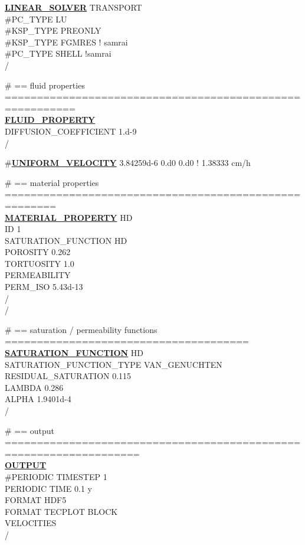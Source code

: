 \noindent
\hyperlink{target_linsolv}{\bf LINEAR\_SOLVER} TRANSPORT\\
\#PC\_TYPE LU\\
\#KSP\_TYPE PREONLY\\
\#KSP\_TYPE FGMRES ! samrai\\
\#PC\_TYPE SHELL !samrai\\
/

\noindent
\# == fluid properties =========================================================\\
\hyperlink{target_fluid_property}{\bf FLUID\_PROPERTY}\\
DIFFUSION\_COEFFICIENT 1.d-9\\
/

\noindent
\#\hyperlink{target_unifvel}{\bf UNIFORM\_VELOCITY} 3.84259d-6 0.d0 0.d0  ! 1.38333 cm/h

\noindent
\# == material properties ======================================================\\
\hyperlink{target_mat}{\bf MATERIAL\_PROPERTY} HD\\
ID 1\\
SATURATION\_FUNCTION HD\\
POROSITY 0.262\\
TORTUOSITY 1.0\\
PERMEABILITY\\
PERM\_ISO 5.43d-13\\
/\\
/

\noindent
\# == saturation / permeability functions ======================================\\
\hyperlink{target_sat}{\bf SATURATION\_FUNCTION} HD\\
SATURATION\_FUNCTION\_TYPE VAN\_GENUCHTEN\\
RESIDUAL\_SATURATION 0.115\\
LAMBDA 0.286\\
ALPHA 1.9401d-4\\
/

\noindent
\# == output ===================================================================\\
\hyperlink{target_output}{\bf OUTPUT}\\
\#PERIODIC TIMESTEP 1\\
PERIODIC TIME 0.1 y\\
FORMAT HDF5\\
FORMAT TECPLOT BLOCK\\
VELOCITIES\\
/

